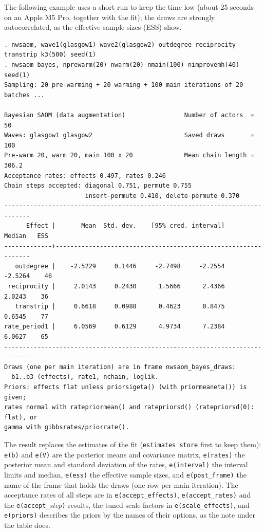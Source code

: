 The following example uses a short run to keep the time low (about 25 seconds on an Apple M5 Pro, together with the fit); the draws are strongly autocorrelated, as the effective sample sizes (ESS) show.
\begin{lstlisting}
. nwsaom, wave1(glasgow1) wave2(glasgow2) outdegree reciprocity transtrip k3(500) seed(1)
. nwsaom bayes, nprewarm(20) nwarm(20) nmain(100) nimprovemh(40) seed(1)
Sampling: 20 pre-warming + 20 warming + 100 main iterations of 20 batches ...

Bayesian SAOM (data augmentation)                Number of actors  =       50
Waves: glasgow1 glasgow2                         Saved draws       =      100
Pre-warm 20, warm 20, main 100 x 20              Mean chain length =    306.2
Acceptance rates: effects 0.497, rates 0.246
Chain steps accepted: diagonal 0.751, permute 0.755
                      insert-permute 0.410, delete-permute 0.370
-----------------------------------------------------------------------------
      Effect |       Mean  Std. dev.    [95% cred. interval]     Median   ESS
-------------+---------------------------------------------------------------
   outdegree |    -2.5229     0.1446     -2.7498     -2.2554    -2.5264    46
 reciprocity |     2.0143     0.2430      1.5666      2.4366     2.0243    36
   transtrip |     0.6618     0.0988      0.4623      0.8475     0.6545    77
rate_period1 |     6.0569     0.6129      4.9734      7.2384     6.0627    65
-----------------------------------------------------------------------------
Draws (one per main iteration) are in frame nwsaom_bayes_draws:
  b1..b3 (effects), rate1, nchain, loglik.
Priors: effects flat unless priorsigeta() (with priormeaneta()) is given;
rates normal with ratepriormean() and ratepriorsd() (ratepriorsd(0): flat), or
gamma with gibbsrates/priorrate().
\end{lstlisting}
The result replaces the estimates of the fit (\texttt{estimates store} first to keep them): \texttt{e(b)} and \texttt{e(V)} are the posterior means and covariance matrix, \texttt{e(rates)} the posterior mean and standard deviation of the rates, \texttt{e(interval)} the interval limits and median, \texttt{e(ess)} the effective sample sizes, and \texttt{e(post\_frame)} the name of the frame that holds the draws (one row per main iteration). The acceptance rates of all steps are in \texttt{e(accept\_effects)}, \texttt{e(accept\_rates)} and the \texttt{e(accept\_}\emph{step}\texttt{)} results, the tuned scale factors in \texttt{e(scale\_effects)}, and \texttt{e(priors)} describes the priors by the names of their options, as the note under the table does.


